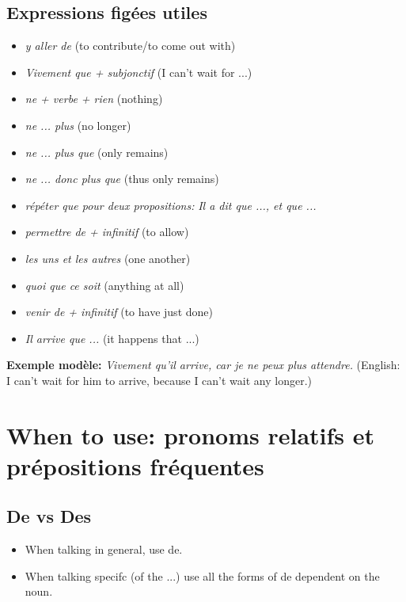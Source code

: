\documentclass{article}
\begin{document}
\subsection{Expressions figées utiles}
\begin{itemize}
    \item \textit{y aller de} (to contribute/to come out with)
    \item \textit{Vivement que + subjonctif} (I can't wait for ...)
    \item \textit{ne + verbe + rien} (nothing)
    \item \textit{ne ... plus} (no longer)
    \item \textit{ne ... plus que} (only remains)
    \item \textit{ne ... donc plus que} (thus only remains)
    \item \textit{répéter \textit{que} pour deux propositions:} \textit{Il a dit que ..., et que ...}
    \item \textit{permettre de + infinitif} (to allow)
    \item \textit{les uns et les autres} (one another)
    \item \textit{quoi que ce soit} (anything at all)
    \item \textit{venir de + infinitif} (to have just done)
    \item \textit{Il arrive que ...} (it happens that ...)
\end{itemize}
\textbf{Exemple modèle:} \textit{Vivement qu'il arrive, car je ne peux plus attendre.} (English: I can't wait for him to arrive, because I can't wait any longer.)

\section{When to use: pronoms relatifs et prépositions fréquentes}

\subsection{De vs Des}
    \begin{itemize}
        \item When talking in general, use de.
        \item When talking specifc (of the ...) use all the forms of de dependent on the noun.
    \end{itemize}
\end{document}
